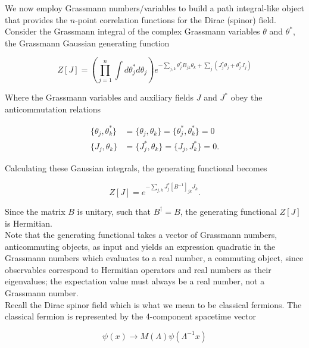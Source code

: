 
\noindent We now employ Grassmann numbers/variables to build a path integral-like object that provides the $n$-point correlation functions for the Dirac (spinor) field. \\

\noindent Consider the Grassmann integral of the complex Grassmann variables $\theta$ and $\theta^*$, the Grassmann Gaussian generating function

\begin{equation}
Z[J] = \left( \prod_{j=1}^n \int d\theta^*_j d\theta_j \right) e^{- \sum_{j,k} \theta_j^* B_{jk} \theta_k + \sum_j (J_j^* \theta_j + \theta^*_j J_j) }
\end{equation}

\noindent Where the Grassmann variables and auxiliary fields $J$ and $J^*$ obey the anticommutation relations

\begin{align}
\{ \theta_j, \theta_k^* \} &= \{ \theta_j, \theta_k \} = \{\theta_j^*, \theta_k^* \} = 0 \\
\{J_j, \theta_k \} &= \{J_j^*, \theta_k \} = \{ J_j, J_k^* \} = 0.
\end{align}

\noindent Calculating these Gaussian integrals, the generating functional becomes

\begin{equation}
Z[J] = e^{- \sum_{j,k} J_j^* [B^{-1}]_{jk} J_k}.
\end{equation}

\noindent Since the matrix $B$ is unitary, such that $B^\dagger = B$, the generating functional $Z[J]$ is Hermitian. \\

\noindent Note that the generating functional takes a vector of Grassmann numbers, anticommuting objects, as input and yields an expression quadratic in the Grassmann numbers which evaluates to a real number, a commuting object, since observables correspond to Hermitian operators and real numbers as their eigenvalues; the expectation value must always be a real number, not a Grassmann number. \\

\noindent Recall the Dirac spinor field which is what we mean to be classical fermions. The classical fermion is represented by the 4-component spacetime vector

\begin{equation}
\psi (x) \rightarrow M(\Lambda) \psi (\Lambda^{-1} x)
\end{equation}

